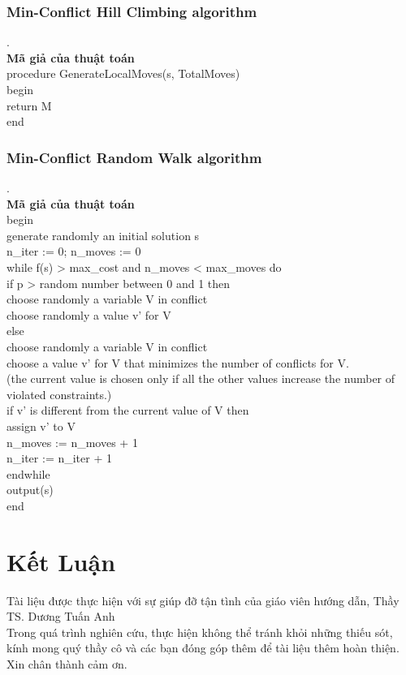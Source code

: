 \documentclass{hcmutarticle}
\begin{document}
\subsubsection{Min-Conflict Hill Climbing algorithm}.\\
{\bfseries Mã giả của thuật toán}\\
procedure GenerateLocalMoves(s, TotalMoves)\\
begin\\
     return M\\
end\\

\subsubsection{Min-Conflict Random Walk algorithm}.\\
{\bfseries Mã giả của thuật toán}\\
begin\\
   generate randomly an initial solution s\\
   n\_iter := 0; n\_moves := 0\\
   while f(s) > max\_cost and n\_moves < max\_moves do\\
      if p > random number between 0 and 1 then\\
        choose randomly a variable V in conflict\\
        choose randomly a value v’ for V\\
      else\\
         choose randomly a variable V in conflict\\
         choose a value v’ for V that minimizes the number of conflicts for V.\\
         (the current value is chosen only if all the other values increase the number of \\
           violated constraints.)\\
       if v’ is different from the current value of V then\\
          assign v’ to V\\
          n\_moves := n\_moves + 1\\
       n\_iter := n\_iter + 1\\
    endwhile\\
    output(s)\\
end\\
\section{Kết Luận }\label{result}
Tài liệu được thực hiện  với sự giúp đỡ tận tình của giáo viên hướng dẫn, Thầy TS. Dương Tuấn Anh\\
Trong quá trình nghiên cứu, thực hiện không thể tránh khỏi những  thiếu sót, kính mong quý thầy  cô và các bạn đóng góp thêm để tài liệu thêm hoàn thiện.\\
Xin chân thành cảm ơn.
\end{document}
